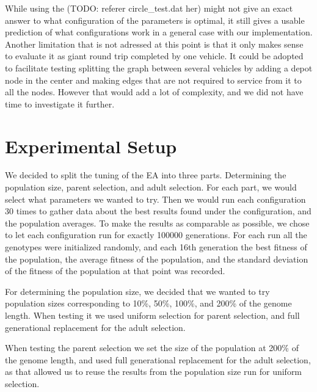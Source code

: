 
While using the (TODO: referer circle\_test.dat her) might not give an exact answer to what configuration of the parameters is optimal, it still gives a usable prediction of what configurations work in a general case with our implementation. Another limitation that is not adressed at this point is that it only makes sense to evaluate it as giant round trip completed by one vehicle. It could be adopted to facilitate testing splitting the graph between several vehicles by adding a depot node in the center and making edges that are not required to service from it to all the nodes. However that would add a lot of complexity, and we did not have time to investigate it further.




\section{Experimental Setup} %
\label{sec:experimental_setup}
We decided to split the tuning of the EA into three parts. Determining the population size, parent selection, and adult selection. For each part, we would select what parameters we wanted to try. Then we would run each configuration 30 times to gather data about the best results found under the configuration, and the population averages. To make the results as comparable as possible, we chose to let each configuration run for exactly 100000 generations. For each run all the genotypes were initialized randomly, and each 16th generation the best fitness of the population, the average fitness of the population, and the standard deviation of the fitness of the population at that point was recorded.

For determining the population size, we decided that we wanted to try population sizes corresponding to 10\%, 50\%, 100\%, and 200\% of the genome length. When testing it we used uniform selection for parent selection, and full generational replacement for the adult selection.

When testing the parent selection we set the size of the population at 200\% of the genome length, and used full generational replacement for the adult selection, as that allowed us to reuse the results from the population size run for uniform selection.

